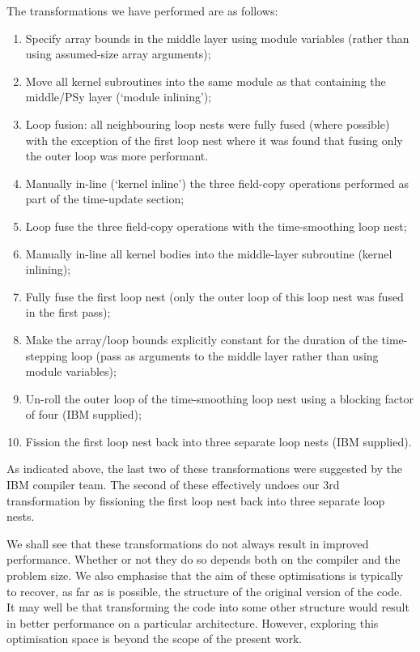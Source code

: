 \documentclass{IOS-Book-Article}
\begin{document}
The transformations we have performed are as follows:
\begin{enumerate}

\item Specify array bounds in the middle layer using module variables
  (rather than using assumed-size array arguments);

\item Move all kernel subroutines into the same module as that
  containing the middle/PSy layer (`module inlining');

\item Loop fusion: all neighbouring loop nests were fully fused (where
  possible) with the exception of the first loop nest where it was
  found that fusing only the outer loop was more performant.

\item Manually in-line (`kernel inline') the three field-copy operations
  performed as part of the time-update section;

\item Loop fuse the three field-copy operations with the
  time-smoothing loop nest;

\item Manually in-line all kernel bodies into the middle-layer
  subroutine (kernel inlining);

\item Fully fuse the first loop nest (only the outer loop of this loop
  nest was fused in the first pass);

\item Make the array/loop bounds explicitly constant for the duration
  of the time-stepping loop (pass as arguments to the middle layer
  rather than using module variables);

\item Un-roll the outer loop of the time-smoothing loop nest using a
blocking factor of four (IBM supplied);

\item Fission the first loop nest back into three separate loop nests
  (IBM supplied).

\end{enumerate}

As indicated above, the last two of these transformations were
suggested by the IBM compiler team. The second of these effectively
undoes our 3rd transformation by fissioning the first loop nest back
into three separate loop nests.

We shall see that these transformations do not always result in
improved performance. Whether or not they do so depends both on the
compiler and the problem size. We also emphasise that the aim of these
optimisations is typically to recover, as far as is possible, the
structure of the original version of the code. It may well be that
transforming the code into some other structure would result in better
performance on a particular architecture. However, exploring this
optimisation space is beyond the scope of the present work.
\end{document}
